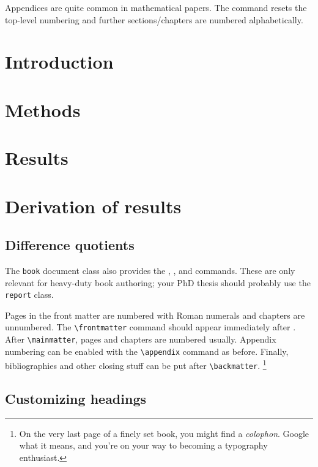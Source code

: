 Appendices are quite common in mathematical papers.
The  command resets the top-level numbering
and further sections/chapters are numbered alphabetically.

\begin{ExampleCode}
\section{Introduction} %
\section{Methods} %
\section{Results} %

\appendix

\section{Derivation of results} %
\subsection{Difference quotients} %
\end{ExampleCode}

The \verb|book| document class also provides the
, , and  commands.
These are only relevant for heavy-duty book authoring;
your PhD thesis should probably use the \verb|report| class.

Pages in the front matter are numbered with Roman numerals
and chapters are unnumbered.
The \verb|\frontmatter| command should appear immediately after \verb||.
After \verb|\mainmatter|, pages and chapters are numbered usually.
Appendix numbering can be enabled with the \verb|\appendix| command as before.
Finally, bibliographies and other closing stuff can be put after \verb|\backmatter|.%
\footnote{On the very last page of a finely set book, you might find a \emph{colophon}.
Google what it means, and you're on your way to becoming a typography enthusiast.}

\subsection{Customizing headings}


